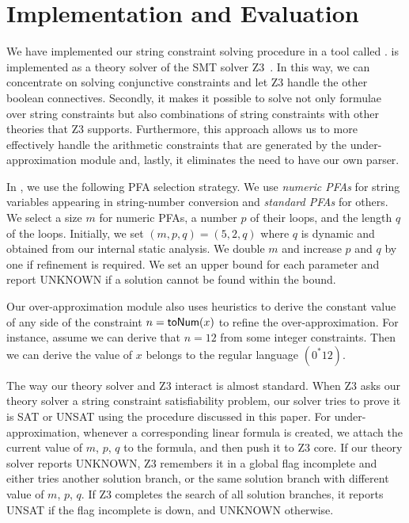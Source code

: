 \section{Implementation and Evaluation}
\label{section:evaluation}

We have implemented our string constraint solving procedure in a tool called {\tool}. {\tool} is implemented as a theory solver of the SMT solver Z3~\cite{z3}. In this way, we can concentrate on solving conjunctive constraints and let Z3 handle the other boolean connectives. Secondly, it makes it possible to solve not only formulae over string constraints but also combinations of string constraints with other theories that Z3 supports. Furthermore, this approach allows us to more effectively handle the arithmetic constraints that are generated by the under-approximation module and, lastly, it eliminates the need to have our own parser. 

In {\tool}, we use the following PFA selection strategy. We use \emph{numeric PFAs} for string variables appearing in string-number conversion and \emph{standard PFAs} for others. We select a size $m$ for numeric PFAs, a number $p$ of their loops, and the length $q$ of the loops. Initially, we set $(m,p,q)=(5,2,q)$ where $q$ is dynamic and obtained from our internal static analysis. We double $m$ and increase $p$ and $q$ by one if refinement is required. We set an upper bound for each parameter and report UNKNOWN if a solution cannot be found within the bound.

Our over-approximation module also uses heuristics to derive the constant value of any side of the constraint $n=\mbox{\textsf{toNum}($x$)}$ to refine the over-approximation. For instance, assume we can derive that $n=12$ from some integer constraints. Then we can derive the value of $x$ belongs to the regular language $(0^*12)$. 

The way our theory solver and Z3 interact is almost standard. When Z3 asks our theory solver a string constraint satisfiability problem, our solver tries to prove it is SAT or UNSAT using the procedure discussed in this paper. For under-approximation, whenever a corresponding linear formula is created, we attach the current value of $m$, $p$, $q$ to the formula, and then push it to Z3 core. If our theory solver reports UNKNOWN, Z3 remembers it in a global flag \textsf{incomplete} and either tries another solution branch, or the same solution branch with different value of $m$, $p$, $q$. If Z3 completes the search of all solution branches, it reports UNSAT if the flag \textsf{incomplete} is down, and UNKNOWN otherwise.


